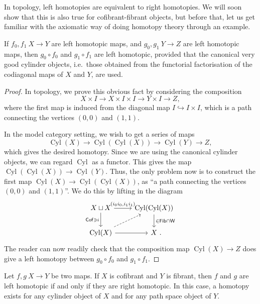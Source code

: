 In topology, left homotopies are equivalent to right homotopies.
We will soon show that this is also true
for cofibrant-fibrant objects,
but before that,
let us get familiar with the axiomatic way of doing homotopy theory
through an example.

\begin{example}
    If $f_0,f_1\:X\to Y$ are left homotopic maps,
    and $g_0,g_1\:Y\to Z$ are left homotopic maps,
    then $g_0\circ f_0$ and $g_1\circ f_1$ are left homotopic,
    provided that the canonical very good cylinder objects,
    i.e.\ those obtained from the functorial factorisation
    of the codiagonal maps of $X$ and $Y$,
    are used.
\end{example}

\begin{proof}
    In topology, we prove this obvious fact by considering the composition
    \[ X\times I\to X\times I\times I\to Y\times I\to Z, \]
    where the first map is induced from the diagonal map $I\hookrightarrow I\times I$,
    which is a path connecting the vertices $(0,0)$ and $(1,1)$.

    In the model category setting,
    we wish to get a series of maps
    \[ \operatorname{Cyl}(X)\to\operatorname{Cyl}(\operatorname{Cyl}(X))\to \operatorname{Cyl}(Y)\to Z, \]
    which gives the desired homotopy.
    Since we are using the canonical cylinder objects,
    we can regard $\operatorname{Cyl}$ as a functor.
    This gives the map $\operatorname{Cyl}(\operatorname{Cyl}(X))\to \operatorname{Cyl}(Y)$.
    Thus, the only problem now is to construct the first map
    $\operatorname{Cyl}(X)\to\operatorname{Cyl}(\operatorname{Cyl}(X))$,
    as ``a path connecting the vertices $(0,0)$ and $(1,1)$''.
    We do this by lifting in the diagram
    \[ \begin{tikzcd}
        X\sqcup X\ar[d,"\cat{Cof}\ni i"']\ar[r,"(i_0i_0\comma i_1i_1)"] & 
        \operatorname{Cyl}(\operatorname{Cyl}(X))\ar[d,"\in\cat{Fib}\cap\cat{W}"] \\
        \operatorname{Cyl}(X)\ar[r]\ar[ru,dashed] & X\rlap{\ .}
    \end{tikzcd} \]
    The reader can now readily check that
    the composition map $\operatorname{Cyl}(X)\to Z$
    does give a left homotopy between $g_0\circ f_0$ and $g_1\circ f_1$.
\end{proof}

\begin{proposition}
    Let $f,g\:X\to Y$ be two maps.
    If $X$ is cofibrant and $Y$ is fibrant, then
    $f$ and $g$ are left homotopic if and only if they are right homotopic.
    In this case, a homotopy exists
    for any cylinder object of $X$ and
    for any path space object of $Y$.
\end{proposition}

